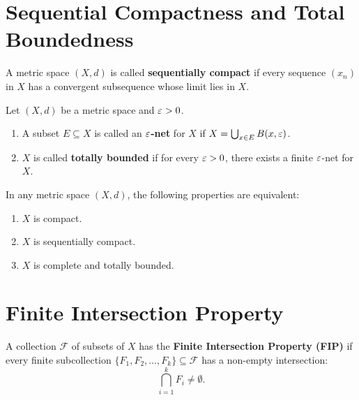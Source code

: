 \section{Sequential Compactness and Total Boundedness}
\label{sec:sequential_compactness}

\begin{definition}
A metric space $(X,d)$ is called \textbf{sequentially compact} if every sequence $(x_n)$ in $X$ has a convergent subsequence whose limit lies in $X$.
\end{definition}

\begin{definition}
Let $(X,d)$ be a metric space and $\varepsilon > 0$.
\begin{enumerate}[label=\rm{(\roman*)}]
    \item A subset $E \subseteq X$ is called an \textbf{$\varepsilon$-net} for $X$ if $X = \bigcup_{x \in E} B(x, \varepsilon)$.
    \item $X$ is called \textbf{totally bounded} if for every $\varepsilon > 0$, there exists a finite $\varepsilon$-net for $X$.
\end{enumerate}
\end{definition}

\begin{theorem}
In any metric space $(X,d)$, the following properties are equivalent:
\begin{enumerate}[label=\rm{(\roman*)}]
    \item $X$ is compact.
    \item $X$ is sequentially compact.
    \item $X$ is complete and totally bounded.
\end{enumerate}
\end{theorem}


\section{Finite Intersection Property}
\label{sec:fip}

\begin{definition}
A collection $\mathcal{F}$ of subsets of $X$ has the \textbf{Finite Intersection Property (FIP)} if every finite subcollection $\{F_1, F_2, \dots, F_k\} \subseteq \mathcal{F}$ has a non-empty intersection:
\[
\bigcap_{i=1}^k F_i \neq \emptyset.
\]
\end{definition}

